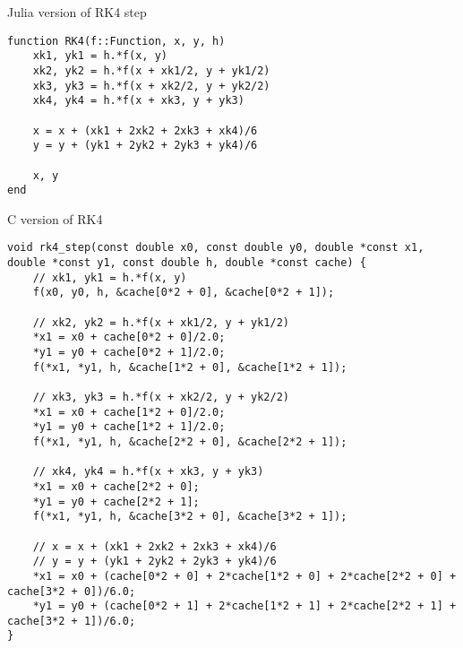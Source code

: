 

\begin{listing}[H]
    \caption{Julia version of RK4 step}
    \label{lst:julia_rk4}
\begin{verbatim}
function RK4(f::Function, x, y, h)
    xk1, yk1 = h.*f(x, y)
    xk2, yk2 = h.*f(x + xk1/2, y + yk1/2)
    xk3, yk3 = h.*f(x + xk2/2, y + yk2/2)
    xk4, yk4 = h.*f(x + xk3, y + yk3)

    x = x + (xk1 + 2xk2 + 2xk3 + xk4)/6
    y = y + (yk1 + 2yk2 + 2yk3 + yk4)/6

    x, y
end
\end{verbatim}
\end{listing}

\begin{listing}[H]
    \caption{C version of RK4}
    \label{lst:c_rk4}
\begin{verbatim}
void rk4_step(const double x0, const double y0, double *const x1, double *const y1, const double h, double *const cache) {
    // xk1, yk1 = h.*f(x, y)
    f(x0, y0, h, &cache[0*2 + 0], &cache[0*2 + 1]);

    // xk2, yk2 = h.*f(x + xk1/2, y + yk1/2)
    *x1 = x0 + cache[0*2 + 0]/2.0;
    *y1 = y0 + cache[0*2 + 1]/2.0;
    f(*x1, *y1, h, &cache[1*2 + 0], &cache[1*2 + 1]);

    // xk3, yk3 = h.*f(x + xk2/2, y + yk2/2)
    *x1 = x0 + cache[1*2 + 0]/2.0;
    *y1 = y0 + cache[1*2 + 1]/2.0;
    f(*x1, *y1, h, &cache[2*2 + 0], &cache[2*2 + 1]);

    // xk4, yk4 = h.*f(x + xk3, y + yk3)
    *x1 = x0 + cache[2*2 + 0];
    *y1 = y0 + cache[2*2 + 1];
    f(*x1, *y1, h, &cache[3*2 + 0], &cache[3*2 + 1]);

    // x = x + (xk1 + 2xk2 + 2xk3 + xk4)/6
    // y = y + (yk1 + 2yk2 + 2yk3 + yk4)/6
    *x1 = x0 + (cache[0*2 + 0] + 2*cache[1*2 + 0] + 2*cache[2*2 + 0] + cache[3*2 + 0])/6.0;
    *y1 = y0 + (cache[0*2 + 1] + 2*cache[1*2 + 1] + 2*cache[2*2 + 1] + cache[3*2 + 1])/6.0;
}
\end{verbatim}
\end{listing}

